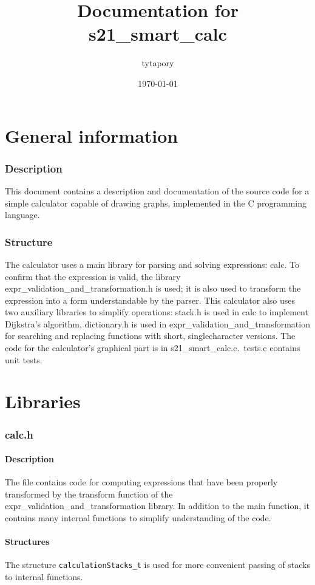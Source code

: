 \documentclass{article}
\title{Documentation for s21\_smart\_calc}
\author{tytapory}
\date{\today}
\begin{document}
\maketitle
\part{General information}
\section{Description}
This document contains a description and documentation of the source code for a simple calculator capable of drawing graphs, implemented in the C programming language.

\section{Structure}
The calculator uses a main library for parsing and solving expressions: calc. To confirm that the expression is valid, the library expr\_validation\_and\_transformation.h is used; it is also used to transform the expression into a form understandable by the parser. This calculator also uses two auxiliary libraries to simplify operations: stack.h is used in calc to implement Dijkstra's algorithm, dictionary.h is used in expr\_validation\_and\_transformation for searching and replacing functions with short, single\-character versions. The code for the calculator's graphical part is in s21\_smart\_calc.c.\ tests.c contains unit tests.

\part{Libraries}
\setcounter{section}{0}
\section{calc.h}
\subsection{Description}
The file contains code for computing expressions that have been properly transformed by the transform function of the expr\_validation\_and\_transformation library. In addition to the main function, it contains many internal functions to simplify understanding of the code.

\subsection{Structures}
The structure \texttt{calculationStacks\_t} is used for more convenient passing of stacks to internal functions.
\end{document}
